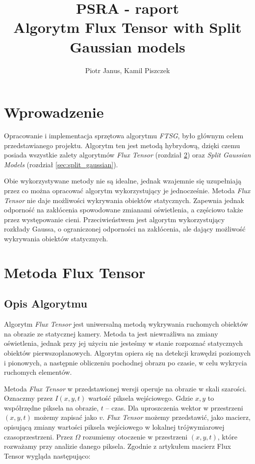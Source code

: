 \documentclass[10pt,a4paper]{article}
\begin{document}
	\title{PSRA - raport  \\  Algorytm Flux Tensor with Split Gaussian models}
	\author{Piotr Janus, Kamil Piszczek}
	\date{}
	\maketitle


\section{Wprowadzenie}

Opracowanie i implementacja sprzętowa algorytmu \textit{FTSG}, było głównym celem przedstawianego projektu. Algorytm ten jest metodą hybrydową, dzięki czemu posiada wszystkie zalety algorytmów \textit{Flux Tensor} (rozdział \ref{sec:FluxTensor_Teoria}) oraz \textit{Split Gaussian Models} (rozdział \ref{sec:split_gaussian}).   

Obie wykorzystywane metody nie są idealne, jednak wzajemnie się uzupełniają przez co można opracować algorytm wykorzystujący je jednocześnie. Metoda \textit{Flux Tensor} nie daje możliwości wykrywania obiektów statycznych. Zapewnia jednak odporność na zakłócenia spowodowane zmianami oświetlenia, a częściowo także przez występowanie cieni. Przeciwieństwem jest algorytm wykorzystujący rozkłady Gaussa, o ograniczonej odporności na zakłócenia, ale dający możliwość wykrywania obiektów statycznych. 

\section{Metoda Flux Tensor}
\label{sec:FluxTensor_Teoria}

\subsection{Opis Algorytmu}
\label{sec:FluxTensorOpis}

Algorytm \textit{Flux Tensor} jest uniwersalną metodą wykrywania ruchomych obiektów na obrazie ze statycznej kamery. Metoda ta jest niewrażliwa na zmiany oświetlenia, jednak przy jej użyciu nie jesteśmy w stanie rozpoznać statycznych obiektów pierwszoplanowych. Algorytm opiera się na detekcji krawędzi poziomych i pionowych, a następnie obliczeniu pochodnej obrazu po czasie, w celu wykrycia ruchomych elementów.

Metoda \emph{Flux Tensor} w przedstawionej wersji operuje na obrazie w skali szarości. Oznaczmy przez $I(x,y,t)$ wartość piksela wejściowego. Gdzie $x,y$ to współrzędne piksela na obrazie, $t$ – czas. Dla uproszczenia wektor w przestrzeni $(x,y,t)$ możemy zapisać jako $v$.
\textit{Flux Tensor} możemy przedstawić, jako macierz, opisującą zmiany wartości piksela wejściowego w lokalnej trójwymiarowej czasoprzestrzeni. Przez $\Omega$ rozumiemy otoczenie w przestrzeni $(x,y,t)$, które rozważamy przy analizie danego piksela. Zgodnie z artykułem \cite{wang_14} macierz Flux Tensor wygląda następująco:
 
\end{document}
